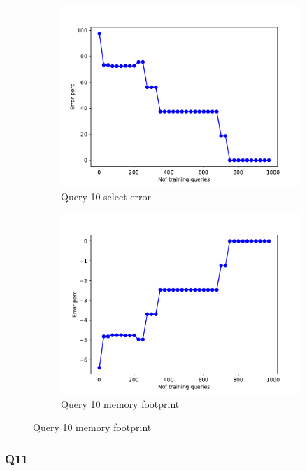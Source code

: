 \begin{figure}[htb!]
  \begin{subfigure}[t]{0.5\textwidth}
    \includegraphics[scale=0.4]{figs/airtraffic/airtraffic_sel10_error.pdf}
    \caption{Query 10 select error}
    \label{fig:sel10}
  \end{subfigure}
  \begin{subfigure}[t]{0.5\textwidth}
    \includegraphics[scale=0.4]{figs/airtraffic/airtraffic_q10_memerror.pdf}
    \caption{Query 10 memory footprint}
    \label{fig:mem10}
   \end{subfigure}
\end{figure}


\subsubsection{Q11}

